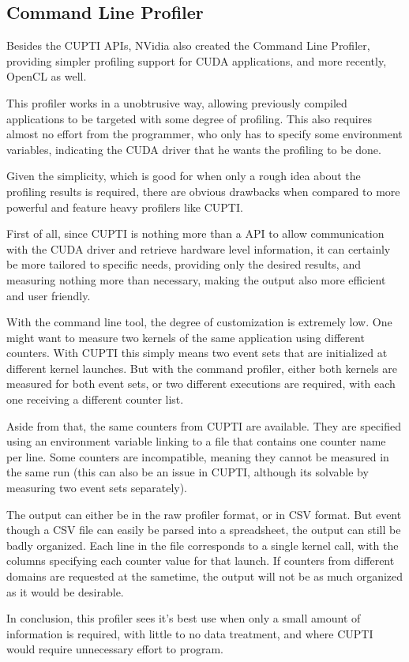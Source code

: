 \subsection{Command Line Profiler}
\label{sec:330}

Besides the CUPTI APIs, NVidia also created the Command Line Profiler, providing simpler profiling support for CUDA applications, and more recently, OpenCL as well.

This profiler works in a unobtrusive way, allowing previously compiled applications to be targeted with some degree of profiling. This also requires almost no effort from the programmer, who only has to specify some environment variables, indicating the CUDA driver that he wants the profiling to be done.

Given the simplicity, which is good for when only a rough idea about the profiling results is required, there are obvious drawbacks when compared to more powerful and feature heavy profilers like CUPTI.

First of all, since CUPTI is nothing more than a API to allow communication with the CUDA driver and retrieve hardware level information, it can certainly be more tailored to specific needs, providing only the desired results, and measuring nothing more than necessary, making the output also more efficient and user friendly.

With the command line tool, the degree of customization is extremely low. One might want to measure two kernels of the same application using different counters. With CUPTI this simply means two event sets that are initialized at different kernel launches. But with the command profiler, either both kernels are measured for both event sets, or two different executions are required, with each one receiving a different counter list.

Aside from that, the same counters from CUPTI are available. They are specified using an environment variable linking to a file that contains one counter name per line. Some counters are incompatible, meaning they cannot be measured in the same run (this can also be an issue in CUPTI, although its solvable by measuring two event sets separately).

The output can either be in the raw profiler format, or in CSV format. But event though a CSV file can easily be parsed into a spreadsheet, the output can still be badly organized. Each line in the file corresponds to a single kernel call, with the columns specifying each counter value for that launch. If counters from different domains are requested at the sametime, the output will not be as much organized as it would be desirable.

In conclusion, this profiler sees it's best use when only a small amount of information is required, with little to no data treatment, and where CUPTI would require unnecessary effort to program.